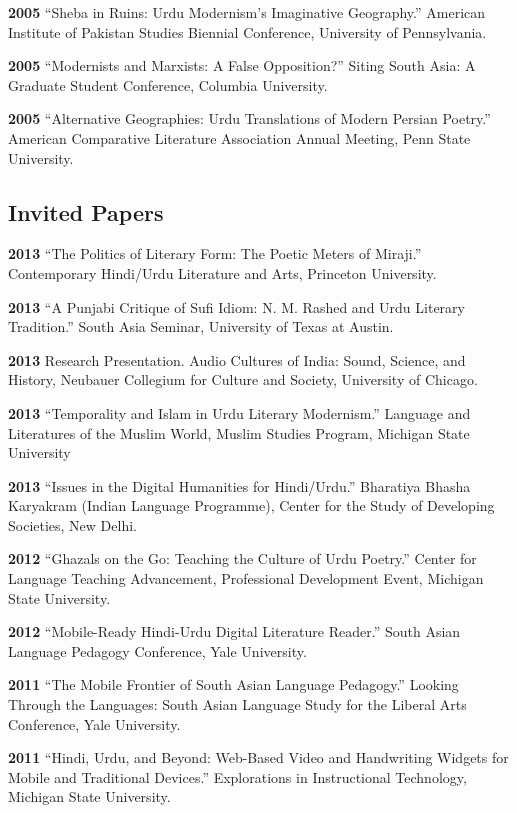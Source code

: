 \documentclass[letterpaper,12pt]{article}
\begin{document}
\textbf{2005}
“Sheba in Ruins: Urdu Modernism’s Imaginative Geography.”
American Institute of Pakistan Studies Biennial Conference, University of Pennsylvania.

\textbf{2005}
“Modernists and Marxists: A False Opposition?”
Siting South Asia: A Graduate Student Conference, Columbia University.

\textbf{2005}
“Alternative Geographies: Urdu Translations of Modern Persian Poetry.”
American Comparative Literature Association Annual Meeting, Penn State University.


\subsection{Invited Papers%
  \label{invited-papers}%
}

\textbf{2013}
“The Politics of Literary Form: The Poetic Meters of Miraji.”
Contemporary Hindi/Urdu Literature and Arts, Princeton University.

\textbf{2013}
“A Punjabi Critique of Sufi Idiom: N. M. Rashed and Urdu Literary Tradition.”
South Asia Seminar, University of Texas at Austin.

\textbf{2013}
Research Presentation.
Audio Cultures of India: Sound, Science, and History,
Neubauer Collegium for Culture and Society, University of Chicago.

\textbf{2013}
“Temporality and Islam in Urdu Literary Modernism.”
Language and Literatures of the Muslim World,
Muslim Studies Program,
Michigan State University

\textbf{2013}
“Issues in the Digital Humanities for Hindi/Urdu.”
Bharatiya Bhasha Karyakram (Indian Language Programme),
Center for the Study of Developing Societies, New Delhi.

\textbf{2012}
“Ghazals on the Go: Teaching the Culture of Urdu Poetry.”
Center for Language Teaching Advancement,
Professional Development Event,
Michigan State University.

\textbf{2012}
“Mobile-Ready Hindi-Urdu Digital Literature Reader.”
South Asian Language Pedagogy Conference, Yale University.

\textbf{2011}
“The Mobile Frontier of South Asian Language Pedagogy.”
Looking Through the Languages:
South Asian Language Study for the Liberal Arts Conference,
Yale University.

\textbf{2011}
“Hindi, Urdu, and Beyond:
Web-Based Video and Handwriting Widgets for Mobile and Traditional Devices.”
Explorations in Instructional Technology, Michigan State University.
\end{document}
